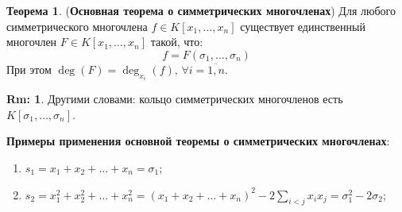 \documentclass[12pt]{article}
\theoremstyle{definition}
\newtheorem{rem}{Rm:}
\newtheorem{theorem}{Теорема}
\newcommand{\ddsum}[2]{\displaystyle\sum\limits_{#1}^{#2}}
\newcommand{\ovl}[1]{\overline{#1}}
\begin{document}
\begin{theorem}(\textbf{Основная теорема о симметрических многочленах})
	Для любого симметрического многочлена $f \in K[x_1,\dotsc,x_n]$ существует единственный многочлен $F \in K[x_1,\dotsc,x_n]$ такой, что:
	$$
		f = F(\sigma_1,\dotsc,\sigma_n)
	$$
	При этом $\deg(F) = \deg_{x_i}(f), \, \forall i = \ovl{1,n}$.
\end{theorem}
\begin{rem}
	Другими словами: кольцо симметрических многочленов есть $K[\sigma_1,\dotsc,\sigma_n]$.
\end{rem}

\textbf{Примеры применения основной теоремы о симметрических многочленах}:
\begin{enumerate}[label=\arabic*)]
	\item $s_1 = x_1 + x_2 + \dotsc + x_n = \sigma_1$;
	\item $s_2 = x_1^2 + x_2^2 + \dotsc + x_n^2 = (x_1 + x_2 + \dotsc + x_n)^2 - 2\ddsum{i < j}{}x_ix_j = \sigma_1^2 -2\sigma_2$;
\end{enumerate}
\end{document}
